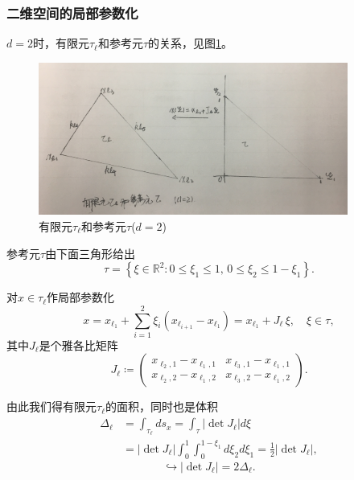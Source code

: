 \subsubsection{二维空间的局部参数化}
$d=2$时，有限元$\tau_{\ell}$和参考元$\tau$的关系，见图\ref{fig:finele-ref-finele-refele}。

\begin{figure}[htbp]
  \centering
  \includegraphics[width=4in]{./figures/20171210-finele-refele}
 \caption{有限元$\tau_{\ell}$和参考元$\tau$($d=2$)}
\label{fig:finele-ref-finele-refele}

\end{figure}

参考元$\tau$由下面三角形给出
\begin{equation}
  \label{eq:finele-ref-d2-refele-def}
  \tau = \left\{
  \xi \in \mathbb{R}^{2}: 0 \le \xi_{1} \le 1, \, 0 \le \xi_{2} \le 1 - \xi_{1} \right\}.
\end{equation}

对$x \in \tau_{\ell}$作局部参数化
\begin{equation*}
  x = x_{\ell_{1}} + \sum_{i=1}^{2} \xi_{i} \left( x_{\ell_{i+1}} - x_{\ell_{1}} \right) = x_{\ell_{1}} + J_{\ell} \, \xi, \quad \xi \in \tau,
\end{equation*}
其中$J_{\ell}$是个雅各比矩阵
\begin{equation*}
  J_{\ell} \coloneqq
  \begin{pmatrix}
    x_{\ell_{2}, 1} - x_{\ell_{1}, 1} &
    x_{\ell_{3}, 1} - x_{\ell_{1}, 1} \\
    x_{\ell_{2}, 2} - x_{\ell_{1}, 2} &
    x_{\ell_{3}, 2} - x_{\ell_{1}, 2}
  \end{pmatrix}.
\end{equation*}

由此我们得有限元$\tau_{\ell}$的面积，同时也是体积
\begin{equation*}
\begin{split}
    \Delta_{\ell} & = \int_{\tau_{\ell}} d s_{x} = \int_{\tau} \left| \det J_{\ell} \right| d \xi \\
    & = \left| \det J_{\ell} \right| \int_{0}^{1} \int_{0}^{1-\xi_{1}} d \xi_{2} d \xi_{1} = \frac{1}{2} \left| \det J_{\ell} \right|,
\end{split}
\end{equation*}
\begin{equation}
  \label{eq:finele-ref-d2-volume-matrix-determinant}
  \hookrightarrow \left| \det J_{\ell} \right| = 2 \Delta_{\ell}.
\end{equation}

